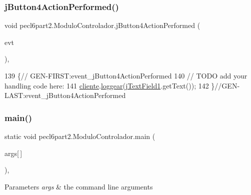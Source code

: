 \subsubsection{\texorpdfstring{j\+Button4\+Action\+Performed()}{jButton4ActionPerformed()}}
{\footnotesize\ttfamily void pecl6part2.\+Modulo\+Controlador.\+j\+Button4\+Action\+Performed (\begin{DoxyParamCaption}\item[{java.\+awt.\+event.\+Action\+Event}]{evt }\end{DoxyParamCaption})\hspace{0.3cm}{\ttfamily [inline]}, {\ttfamily [private]}}


\begin{DoxyCode}
139                                                                          \{\textcolor{comment}{//
      GEN-FIRST:event\_jButton4ActionPerformed}
140         \textcolor{comment}{// TODO add your handling code here:}
141         \mbox{\hyperlink{classpecl6part2_1_1_modulo_controlador_a62308c2ac095ab8b16d1478b2577891e}{cliente}}.\mbox{\hyperlink{classpecl6part2_1_1_cliente_controlador_acaff5088389f8aa5f3571c802b910d28}{loggear}}(\mbox{\hyperlink{classpecl6part2_1_1_modulo_controlador_a7a8c12d92360f65dd601091c44ef20d9}{jTextField1}}.getText());
142     \}\textcolor{comment}{//GEN-LAST:event\_jButton4ActionPerformed}
\end{DoxyCode}
\mbox{\label{classpecl6part2_1_1_modulo_controlador_aceaf216d4144b2ef405fe43d5d6ea8e5}} 
\subsubsection{\texorpdfstring{main()}{main()}}
{\footnotesize\ttfamily static void pecl6part2.\+Modulo\+Controlador.\+main (\begin{DoxyParamCaption}\item[{String}]{args\mbox{[}$\,$\mbox{]} }\end{DoxyParamCaption})\hspace{0.3cm}{\ttfamily [inline]}, {\ttfamily [static]}}


\begin{DoxyParams}{Parameters}
{\em args} & the command line arguments \\
\hline
\end{DoxyParams}


